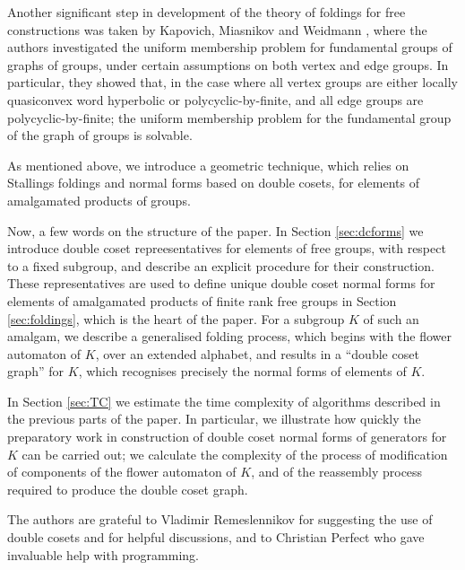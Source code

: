 \documentclass[a4paper,12pt]{article}
\numberwithin{equation}{section}
\numberwithin{figure}{section}
\begin{document}
Another significant step in development of the theory of foldings for  
free constructions
 was taken by Kapovich, Miasnikov and Weidmann
\cite{KMW03}, where the authors investigated the uniform membership
problem for fundamental groups of graphs of groups, under certain
assumptions on both vertex and edge groups. In particular, they
showed that, in the case where all vertex groups are either locally
quasiconvex word hyperbolic or polycyclic-by-finite, and all edge
groups are polycyclic-by-finite; the uniform membership problem for the
fundamental group of the graph of groups is solvable.

As mentioned above, we  introduce a  geometric
technique, which relies on Stallings foldings and
normal forms based on double cosets, for elements of amalgamated products of
groups.

Now, a few words on the structure of the paper. In Section
\ref{sec:dcforms} we introduce double coset repreesentatives for
elements of free groups, with respect to a fixed subgroup,
and
  describe an explicit procedure
 for their construction.
These representatives are used to define unique double coset normal forms
for elements of
amalgamated products of finite rank free groups in Section  \ref{sec:foldings}, which
 is the heart of the paper. For a subgroup $K$ of such an amalgam, we
describe a generalised folding process, which begins with the flower automaton
of $K$, over an extended alphabet, and results in
a ``double coset graph'' for $K$, which  recognises
precisely the  normal forms of elements of $K$.

In Section \ref{sec:TC} we estimate the time complexity of
algorithms described in the previous parts of the paper. In
particular, we illustrate how quickly the  preparatory
work in construction of  double coset normal forms of generators
for $K$  can be carried out; we calculate  the complexity of the process of 
modification of
components of the flower automaton of $K$, and of the reassembly process required to
produce the double coset graph.

The authors are grateful to Vladimir Remeslennikov for suggesting the use of double 
cosets and
for helpful
discussions,  and to Christian Perfect who gave invaluable help with programming.
\end{document}
